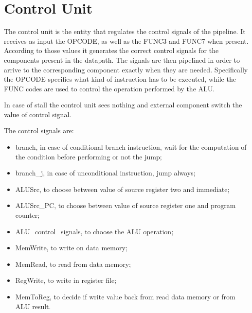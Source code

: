 %
\chapter{Control Unit}
\label{cha3}
The control unit is the entity that regulates the control signals of the pipeline. It receives as input the OPCODE, as well as the FUNC3 and FUNC7 when present. 
According to those values it generates the correct control signals for the components present in the datapath. The signals are then pipelined in order to 
arrive to the corresponding component exactly when they are needed. Specifically the OPCODE specifies what kind of instruction has to be executed, while the
FUNC codes are used to control the operation performed by the ALU.

In case of stall the control unit sees nothing and external component switch the value of control signal.

The control signals are:
\begin{itemize}
    \item branch, in case of conditional branch instruction, wait for the computation of the condition before performing or not the jump;
    \item branch\_j, in case of unconditional instruction, jump always;
    \item ALUSrc, to choose between value of source register two and immediate;
    \item ALUSrc\_PC, to choose between value of source register one and program counter;
    \item ALU\_control\_signals, to choose the ALU operation;
    \item MemWrite, to write on data memory;
    \item MemRead, to read from data memory;
    \item RegWrite, to write in register file;
    \item MemToReg, to decide if write value back from read data memory or from ALU result.
\end{itemize}



